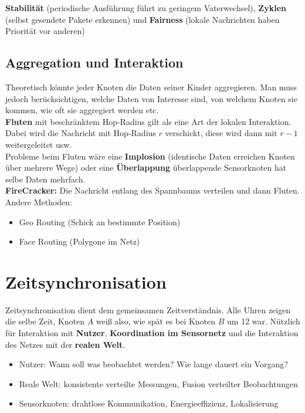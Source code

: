 \documentclass[a4paper]{article}
\begin{document}
\textbf{Stabilität} (periodische Ausführung führt zu geringem Vaterwechsel), \textbf{Zyklen} (selbst gesendete Pakete erkennen) und \textbf{Fairness} (lokale Nachrichten haben Priorität vor anderen)
	
\subsection{Aggregation und Interaktion}
Theoretisch könnte jeder Knoten die Daten seiner Kinder aggregieren. Man muss jedoch berücksichtigen, welche Daten von Interesse sind, von welchem Knoten sie kommen, wie oft sie aggregiert werden etc.\\

\textbf{Fluten} mit beschränktem Hop-Radius gilt als eine Art der lokalen Interaktion. Dabei wird die Nachricht mit Hop-Radius $r$ verschickt, diese wird dann mit $r-1$ weitergeleitet usw.\\
Probleme beim Fluten wäre eine \textbf{Implosion} (identische Daten erreichen Knoten über mehrere Wege) oder eine \textbf{Überlappung} überlappende Sensorknoten hat selbe Daten mehrfach.\\

\textbf{FireCracker:} Die Nachricht entlang des Spannbaums verteilen und dann Fluten.\\

Andere Methoden:
\begin{itemize}
	\item Geo Routing (Schick an bestimmte Position)
	\item Face Routing (Polygone im Netz)
\end{itemize}

\newpage
\section{Zeitsynchronisation}
Zeitsynchronisation dient dem gemeinsamen Zeitverständnis. Alle Uhren zeigen die selbe Zeit, Knoten $A$ weiß also, wie spät es bei Knoten $B$ um 12 war. Nützlich für Interaktion mit \textbf{Nutzer}, \textbf{Koordination im Sensornetz} und die Interaktion des Netzes mit der \textbf{realen Welt}.
\begin{itemize}
	\item Nutzer: Wann soll was beobachtet werden? Wie lange dauert ein Vorgang?
	\item Reale Welt: konsistente verteilte Messungen, Fusion verteilter Beobachtungen
	\item Sensorknoten: drahtlose Kommunikation, Energieeffizienz, Lokalisierung
\end{itemize}
\end{document}
